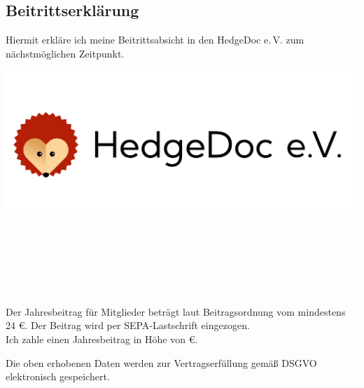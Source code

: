\documentclass[paper=a4,twoside=false,DIV=15,fontsize=11pt,parskip=half]{scrartcl}
\begin{document}
\begin{Form}

\begin{minipage}[h]{0.5\textwidth}
  \section*{\huge Beitrittserklärung}
  Hiermit erkläre ich meine Beitrittsabsicht in den HedgeDoc e.\,V. zum nächstmöglichen Zeitpunkt.\\[-\baselineskip]
\end{minipage}
\begin{minipage}[h]{0.5\textwidth}
  \hfill
  \includegraphics[width=0.3\paperwidth]{./hedgedoc-ev.pdf}
\end{minipage}


\\[2mm]
\hfill {}\\[2mm]
\\[-\baselineskip]

\\[2mm]
\\[2mm]
\hfill {}\\[-\baselineskip]

Der Jahresbeitrag für Mitglieder beträgt laut Beitragsordnung vom \datumbeitrago mindestens 24 €. Der Beitrag wird per SEPA-Lastschrift eingezogen.\\[2mm]
Ich zahle einen Jahresbeitrag in Höhe von  €.

Die oben erhobenen Daten werden zur Vertragserfüllung gemäß DSGVO elektronisch gespeichert.


\end{Form}
\end{document}
